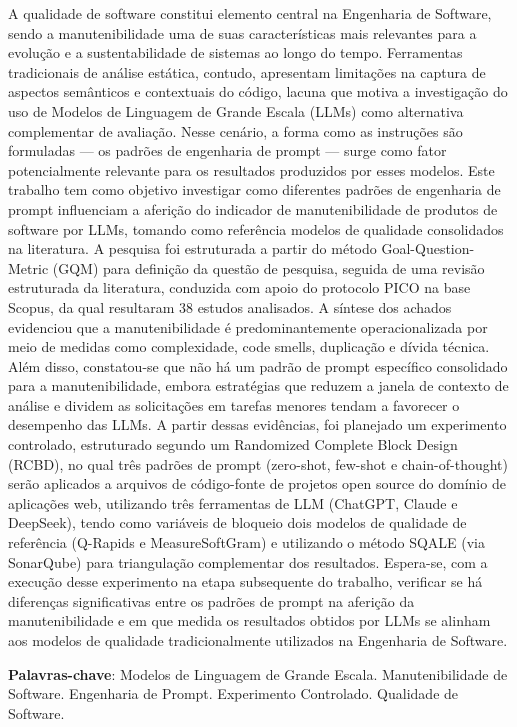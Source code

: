 \begin{resumo}
  A qualidade de software constitui elemento central na Engenharia de Software, sendo a manutenibilidade uma de suas características mais relevantes para a evolução e a sustentabilidade de sistemas ao longo do tempo. Ferramentas tradicionais de análise estática, contudo, apresentam limitações na captura de aspectos semânticos e contextuais do código, lacuna que motiva a investigação do uso de Modelos de Linguagem de Grande Escala (LLMs) como alternativa complementar de avaliação. Nesse cenário, a forma como as instruções são formuladas — os padrões de engenharia de prompt — surge como fator potencialmente relevante para os resultados produzidos por esses modelos. Este trabalho tem como objetivo investigar como diferentes padrões de engenharia de prompt influenciam a aferição do indicador de manutenibilidade de produtos de software por LLMs, tomando como referência modelos de qualidade consolidados na literatura. A pesquisa foi estruturada a partir do método Goal-Question-Metric (GQM) para definição da questão de pesquisa, seguida de uma revisão estruturada da literatura, conduzida com apoio do protocolo PICO na base Scopus, da qual resultaram 38 estudos analisados. A síntese dos achados evidenciou que a manutenibilidade é predominantemente operacionalizada por meio de medidas como complexidade, code smells, duplicação e dívida técnica. Além disso, constatou-se que não há um padrão de prompt específico consolidado para a manutenibilidade, embora estratégias que reduzem a janela de contexto de análise e dividem as solicitações em tarefas menores tendam a favorecer o desempenho das LLMs. A partir dessas evidências, foi planejado um experimento controlado, estruturado segundo um Randomized Complete Block Design (RCBD), no qual três padrões de prompt (zero-shot, few-shot e chain-of-thought) serão aplicados a arquivos de código-fonte de projetos open source do domínio de aplicações web, utilizando três ferramentas de LLM (ChatGPT, Claude e DeepSeek), tendo como variáveis de bloqueio dois modelos de qualidade de referência (Q-Rapids e MeasureSoftGram) e utilizando o método SQALE (via SonarQube) para triangulação complementar dos resultados. Espera-se, com a execução desse experimento na etapa subsequente do trabalho, verificar se há diferenças significativas entre os padrões de prompt na aferição da manutenibilidade e em que medida os resultados obtidos por LLMs se alinham aos modelos de qualidade tradicionalmente utilizados na Engenharia de Software.

  \vspace{\onelineskip}
     
  \noindent
  \textbf{Palavras-chave}: Modelos de Linguagem de Grande Escala. Manutenibilidade de Software. Engenharia de Prompt. Experimento Controlado. Qualidade de Software.
\end{resumo}
